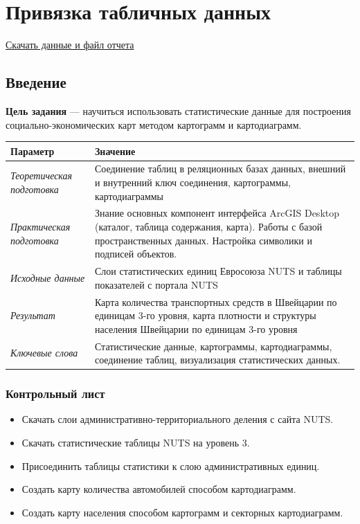 \documentclass[12pt,]{book}
\providecommand{\tightlist}{%
  \setlength{\itemsep}{0pt}\setlength{\parskip}{0pt}}
\begin{document}
\hypertarget{stat-map-economic}{%
\chapter{Привязка табличных данных}\label{stat-map-economic}}

\href{http://autolab.geogr.msu.ru/gis/data/Ex08.zip}{Скачать данные и файл отчета}

\hypertarget{stat-map-economic-intro}{%
\section{Введение}\label{stat-map-economic-intro}}

\textbf{Цель задания} --- научиться использовать статистические данные для построения социально-экономических карт методом картограмм и картодиаграмм.

\begin{longtable}[]{@{}ll@{}}
\toprule
Параметр & Значение\tabularnewline
\midrule
\endhead
\emph{Теоретическая подготовка} & Соединение таблиц в реляционных базах данных, внешний и внутренний ключ соединения, картограммы, картодиаграммы\tabularnewline
\emph{Практическая подготовка} & Знание основных компонент интерфейса ArcGIS Desktop (каталог, таблица содержания, карта). Работы с базой пространственных данных. Настройка символики и подписей объектов.\tabularnewline
\emph{Исходные данные} & Слои статистических единиц Евросоюза NUTS и таблицы показателей с портала NUTS\tabularnewline
\emph{Результат} & Карта количества транспортных средств в Швейцарии по единицам 3-го уровня, карта плотности и структуры населения Швейцарии по единицам 3-го уровня\tabularnewline
\emph{Ключевые слова} & Статистические данные, картограммы, картодиаграммы, соединение таблиц, визуализация статистических данных.\tabularnewline
\bottomrule
\end{longtable}

\hypertarget{stat-map-economic-control}{%
\subsection{Контрольный лист}\label{stat-map-economic-control}}

\begin{itemize}
\tightlist
\item
  Скачать слои административно-территориального деления с сайта NUTS.
\item
  Скачать статистические таблицы NUTS на уровень 3.
\item
  Присоединить таблицы статистики к слою административных единиц.
\item
  Создать карту количества автомобилей способом картодиаграмм.
\item
  Создать карту населения способом картограмм и секторных картодиаграмм.
\end{itemize}
\end{document}
